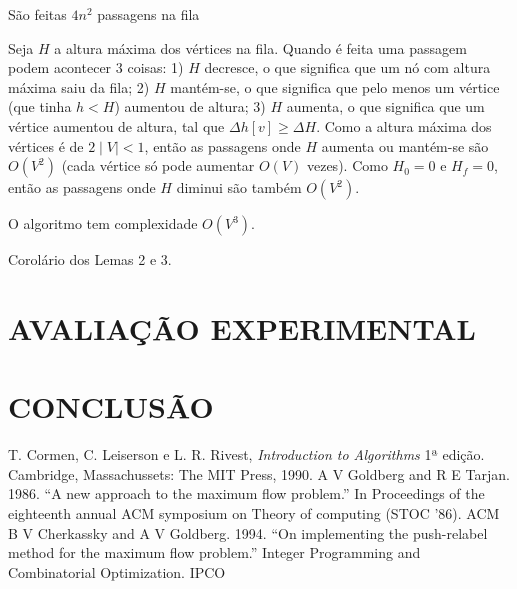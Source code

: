 \documentclass[a4paper, 12pt, conference, portuguese]{ieeeconf}
\begin{document}
\begin{lemma} São feitas $4n^2$ passagens na fila \end{lemma}

\begin{dem}
  Seja $H$ a altura máxima dos vértices na fila. Quando é feita
  uma passagem podem acontecer $3$ coisas: 1) $H$
  decresce, o que significa que um nó com altura máxima saiu da
  fila; 2) $H$ mantém-se, o que significa que pelo menos um
  vértice (que tinha $h < H$) aumentou de altura; 3) $H$ aumenta,
  o que significa que um vértice aumentou de altura, tal que
  $\Delta h[v] \geq \Delta H$. Como a altura máxima dos vértices
  é de $2 \mid V \mid < 1$, então as passagens onde $H$ aumenta
  ou mantém-se são $O(V^2)$ (cada vértice só pode aumentar $O(V)$
  vezes). Como $H_0 = 0$ e $H_f = 0$, então as passagens onde $H$
  diminui são também $O(V^2)$.
\end{dem}

\begin{theorem}
  O algoritmo tem complexidade $O(V^3)$.
\end{theorem}
\begin{dem}
  Corolário dos Lemas 2 e 3.
\end{dem}
\section{AVALIAÇÃO EXPERIMENTAL}\label{experimental}

\section{CONCLUSÃO}\label{conclusion}


\begin{thebibliography}{99}
   T. Cormen, C. Leiserson e L. R. Rivest, \textit{Introduction
    to Algorithms} 1ª edição. Cambridge, Massachussets: The MIT Press,
    1990.
    A V Goldberg and R E Tarjan. 1986.
    ``A new approach to the maximum flow problem.''
    In Proceedings of the eighteenth annual ACM symposium on Theory of computing (STOC '86). ACM
   B V Cherkassky and A V Goldberg. 1994.
    ``On implementing the push-relabel method for the maximum
    flow problem.'' Integer Programming and Combinatorial
    Optimization. IPCO
\end{thebibliography}
\end{document}
